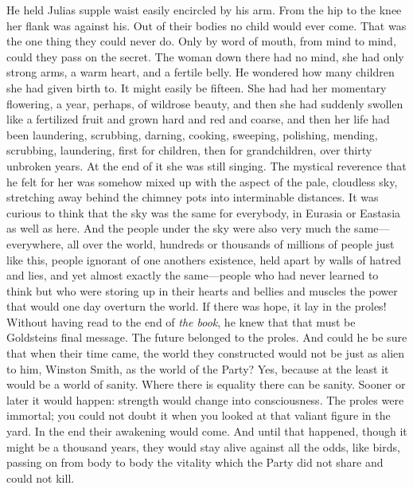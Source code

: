 \begin{paracol}{2}
He held Julia\textquotesingle s supple waist easily encircled by his
arm. From the hip to the knee her flank was against his. Out of their
bodies no child would ever come. That was the one thing they could never
do. Only by word of mouth, from mind to mind, could they pass on the
secret. The woman down there had no mind, she had only strong arms, a
warm heart, and a fertile belly. He wondered how many children she had
given birth to. It might easily be fifteen. She had had her momentary
flowering, a year, perhaps, of wildrose beauty, and then she had
suddenly swollen like a fertilized fruit and grown hard and red and
coarse, and then her life had been laundering, scrubbing, darning,
cooking, sweeping, polishing, mending, scrubbing, laundering, first for
children, then for grandchildren, over thirty unbroken years. At the end
of it she was still singing. The mystical reverence that he felt for her
was somehow mixed up with the aspect of the pale, cloudless sky,
stretching away behind the chimney pots into interminable distances. It
was curious to think that the sky was the same for everybody, in Eurasia
or Eastasia as well as here. And the people under the sky were also very
much the same---everywhere, all over the world, hundreds or thousands of
millions of people just like this, people ignorant of one
another\textquotesingle s existence, held apart by walls of hatred and
lies, and yet almost exactly the same---people who had never learned to
think but who were storing up in their hearts and bellies and muscles
the power that would one day overturn the world. If there was hope, it
lay in the proles! Without having read to the end of \emph{the book}, he
knew that that must be Goldstein\textquotesingle s final message. The
future belonged to the proles. And could he be sure that when their time
came, the world they constructed would not be just as alien to him,
Winston Smith, as the world of the Party? Yes, because at the least it
would be a world of sanity. Where there is equality there can be sanity.
Sooner or later it would happen: strength would change into
consciousness. The proles were immortal; you could not doubt it when you
looked at that valiant figure in the yard. In the end their awakening
would come. And until that happened, though it might be a thousand
years, they would stay alive against all the odds, like birds, passing
on from body to body the vitality which the Party did not share and
could not kill.

\switchcolumn


\end{paracol}
